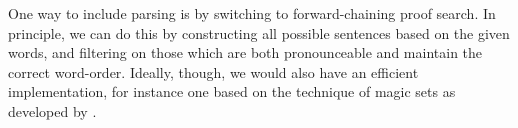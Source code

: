 One way to include parsing is by switching to forward-chaining proof
search. In principle, we can do this by constructing all possible
sentences based on the given words, and filtering on those which are
both pronounceable and maintain the correct word-order. Ideally,
though, we would also have an efficient implementation, for instance
one based on the technique of magic sets as developed by
\citet{bancilhon1985}.

